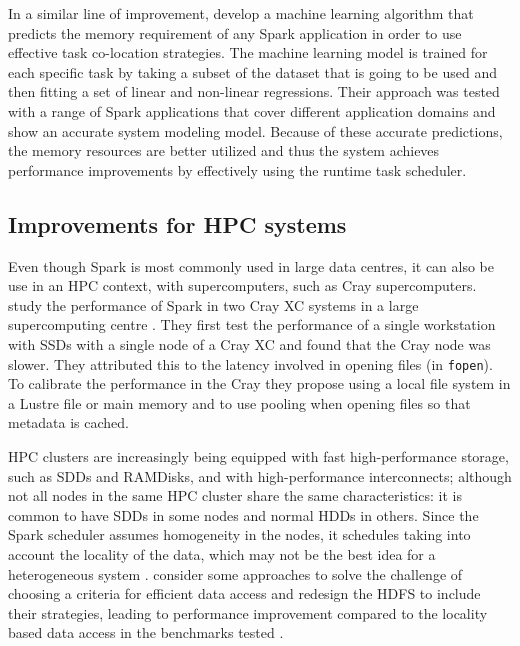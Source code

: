 \documentclass{article}
\begin{document}
In a similar line of improvement, \citeauthor{Marco2017} \cite{Marco2017} develop a machine learning algorithm that predicts the memory requirement of any Spark application in order to use effective task co-location strategies. The machine learning model is trained for each specific task by taking a subset of the dataset that is going to be used and then fitting a set of linear and non-linear regressions. Their approach was tested with a range of Spark applications that cover different application domains and show an accurate system modeling model. Because of these accurate predictions, the memory resources are better utilized and thus the system achieves performance improvements by effectively using the runtime task scheduler.

\subsection{Improvements for HPC systems}

Even though Spark is most commonly used in large data centres, it can also be use in an HPC context, with supercomputers, such as Cray supercomputers. \citeauthor{Chaimov2016} study the performance of Spark in two Cray XC systems in a large supercomputing centre \cite{Chaimov2016}. They first test the performance of a single workstation with SSDs with a single node of a Cray XC and found that the Cray node was slower. They attributed this to the latency involved in opening files (in \texttt{fopen}). To calibrate the performance in the Cray they propose using a local file system in a Lustre file or main memory and to use pooling when opening files so that metadata is cached.

HPC clusters are increasingly being equipped with fast high-performance storage, such as SDDs and RAMDisks, and with high-performance interconnects; although not all nodes in the same HPC cluster share the same characteristics: it is common to have SDDs in some nodes and normal HDDs in others. Since the Spark scheduler assumes homogeneity in the nodes, it schedules taking into account the locality of the data, which may not be the best idea for a heterogeneous system \cite{Islam2016}. \citeauthor{Islam2016} consider some approaches to solve the challenge of choosing a criteria for efficient data access and redesign the HDFS to include their strategies, leading to performance improvement compared to the locality based data access in the benchmarks tested \cite{Islam2016}.
\end{document}
